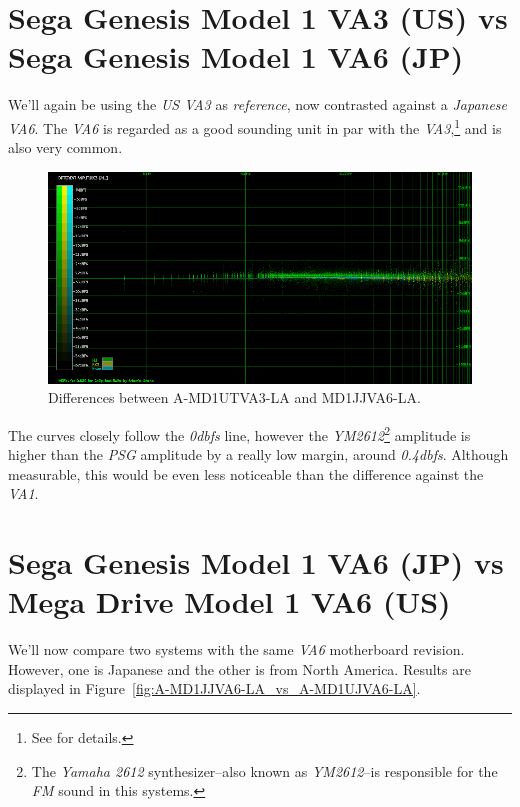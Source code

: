 \documentclass[10pt,a4paper]{report}
\newcommand{\db}[1]{\textit{\mbox{#1\acrshort{dbfs}}}}
\begin{document}
\section{Sega Genesis Model 1 VA3 (US) vs\\ Sega Genesis Model 1 VA6 (JP)}

We'll again be using the \textit{US VA3} as \textit{reference}, now contrasted against a \textit{Japanese VA6}. The \textit{VA6} is regarded as a good sounding unit in par with the \textit{VA3},\footnote{See \cite{genesisaudio} for details.} and is also very common. 

\begin{figure}[H]
	\centering
	\includegraphics[width=1.0\linewidth]{images/results/2-A-MD1UTVA3-LA_vs_A-MD1JJVA6-LA.png}
	\caption[A-MD1UTVA3-LA vs A-MD1JJVA6-LA]{Differences between A-MD1UTVA3-LA and MD1JJVA6-LA.}
	\label{fig:A-MD1UTVA3-LA_vs_A-MD1JJVA6-LA}
\end{figure}

The curves closely follow the \db{0} line, however the \textit{YM2612}\footnote{The \textit{Yamaha 2612} synthesizer--also known as \textit{YM2612}--is responsible for the \textit{FM} sound in this systems.} amplitude is higher than the \textit{PSG} amplitude by a really low margin, around \db{0.4}. Although measurable, this would be even less noticeable than the difference against the \textit{VA1}.

\section{Sega Genesis Model 1 VA6 (JP) vs\\ Mega Drive Model 1 VA6 (US)}

We'll now compare two systems with the same \textit{VA6} motherboard revision. However, one is Japanese and the other is from North America. Results are displayed in Figure~\ref{fig:A-MD1JJVA6-LA_vs_A-MD1UJVA6-LA}.
\end{document}
